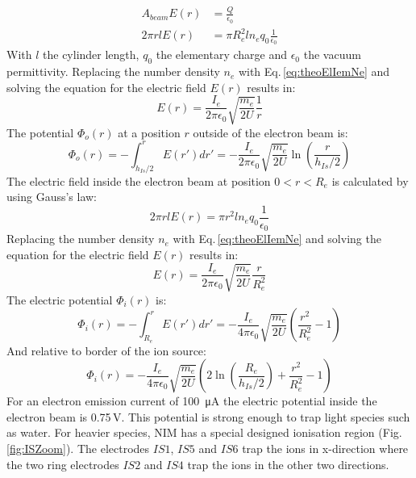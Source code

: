 		\begin{align}
			A_{beam} E(r) &= \frac{Q}{\epsilon_0}\\
			2\pi r l E(r) &= \pi R_e^2 l n_e q_0 \frac{1}{\epsilon_0}
		\end{align}
		With $l$ the cylinder length, $q_0$ the elementary charge and $\epsilon_0$ the vacuum permittivity. Replacing the number density $n_e$ with Eq.\,\eqref{eq:theoElIemNe} and solving the equation for the electric field $E(r)$ results in:
		\begin{equation}
			E(r) = \frac{I_e}{2 \pi \epsilon_0} \sqrt{\frac{m_e}{2U}}\frac{1}{r}
		\end{equation}
		The potential $\Phi_o (r)$ at a position $r$ outside of the electron beam is:
		\begin{equation}
			\Phi_o (r) = -\int_{h_{Is}/2}^{r} E(r') dr' = -\frac{I_e}{2\pi\epsilon_0}\sqrt{\frac{m_e}{2U}}\ln\left(\frac{r}{h_{Is}/2}\right)
		\end{equation}
		The electric field inside the electron beam at position $0<r<R_e$ is calculated by using Gauss's law:
		\begin{equation}
			2\pi r l E(r) = \pi r^2 l n_e q_0 \frac{1}{\epsilon_0}
		\end{equation}
		Replacing the number density $n_e$ with Eq.\,\eqref{eq:theoElIemNe} and solving the equation for the electric field $E(r)$ results in:
		\begin{equation}
			E(r) = \frac{I_e}{2\pi\epsilon_0}\sqrt{\frac{m_e}{2U}}\frac{r}{R_e^2}
		\end{equation}
		The electric potential $\Phi_i (r)$ is:
		\begin{equation}
			\Phi_i (r) = -\int_{R_e}^{r} E(r') dr' = -\frac{I_e}{4\pi\epsilon_0}\sqrt{\frac{m_e}{2U}}\left(\frac{r^2}{R_e^2} -1 \right)
		\end{equation}
		And relative to border of the ion source:
		\begin{equation}
			\Phi_i (r) = -\frac{I_e}{4\pi\epsilon_0}\sqrt{\frac{m_e}{2U}}\left(2\ln\left(\frac{R_e}{h_{Is}/2}\right) +\frac{r^2}{R_e^2} -1 \right)
			\label{eq:elPotIem}
		\end{equation}
		For an electron emission current of 100~\si{\micro\ampere} the electric potential inside the electron beam is 0.75\,\si{\volt}. This potential is strong enough to trap light species such as water. For heavier species, NIM has a special designed ionisation region (Fig.\,\ref{fig:ISZoom}). The electrodes $IS 1$, $IS 5$ and $IS 6$ trap the ions in x-direction where the two ring electrodes $IS 2$ and $IS 4$ trap the ions in the other two directions.		
